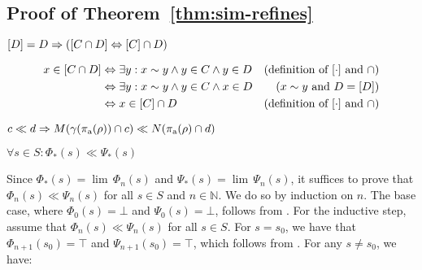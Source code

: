 \subsection{Proof of Theorem~\ref{thm:sim-refines}}

\begin{lemma} \label{lem:class-inv-meet}
$[D] = D \Rightarrow ([C \cap D] \Leftrightarrow [C] \cap D)$
\end{lemma}
%
\begin{align*}
x \in [C \cap D] & \Leftrightarrow \exists y : x \sim y \wedge y \in C \wedge y \in D & (\textrm{definition of } [\cdot] \textrm{ and } \cap) \\
                     & \Leftrightarrow \exists y : x \sim y \wedge y \in C \wedge x \in D & (x \sim y \textrm{ and } D = [D]) \\
                     & \Leftrightarrow x \in [C] \cap D                               & (\textrm{definition of } [\cdot] \textrm { and } \cap)
\end{align*}

\begin{lemma} \label{lem:G-refines-F}
$c \ll d \Rightarrow M(\gamma(\operatorname{\pi_{\textrm{a}}}(\rho)) \cap c) \ll N(\operatorname{\pi_{\textrm{a}}}(\rho) \cap d)$
\end{lemma}


\begin{lemma} \label{lem:phi-refines-psi}
$\forall s \in S : \Phi_{*}(s) \ll \Psi_{*}(s)$
\end{lemma}

Since $\Phi_{*}(s) = \lim \, \Phi_{n}(s)$ and $\Psi_{*}(s) = \lim \, \Psi_{n}(s)$, it suffices to prove that $\Phi_{n}(s) \ll \Psi_{n}(s)$ for all $s \in S$ and $n \in \mathbb{N}$. We do so by induction on $n$. The base case, where $\Phi_{0}(s) = \bot$ and $\Psi_{0}(s) = \bot$, follows from . For the inductive step, assume that $\Phi_{n}(s) \ll \Psi_{n}(s)$ for all $s \in S$. For $s = s_{0}$, we have that $\Phi_{n+1}(s_{0}) = \top$ and $\Psi_{n+1}(s_{0}) = \top$, which follows from . For any $s \neq s_{0}$, we have:
%

